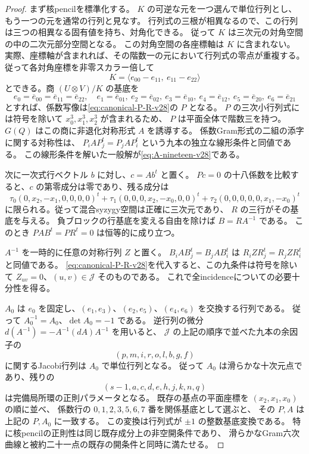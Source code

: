 \begin{proof}
まず核pencilを標準化する。
$K$ の可逆な元を一つ選んで単位行列とし、もう一つの元を通常の行列と見なす。
行列式の三根が相異なるので、この行列は三つの相異なる固有値を持ち、対角化できる。
従って $K$ は三次元の対角空間の中の二次元部分空間となる。
この対角空間の各座標軸は $K$ に含まれない。
実際、座標軸が含まれれば、その階数一の元において行列式の零点が重複する。
従って各対角座標を非零スカラー倍して
\[
 K=\langle e_{00}-e_{11},\ e_{11}-e_{22}\rangle
\]
とできる。商 $(U\otimes V)/K$ の基底を
\[
 e_0=\overline e_{00}=\overline e_{11}=\overline e_{22},\quad
 e_1=\overline e_{01},\ e_2=\overline e_{02},\
 e_3=\overline e_{10},\ e_4=\overline e_{12},\
 e_5=\overline e_{20},\ e_6=\overline e_{21}
\]
とすれば、係数写像は\eqref{eq:canonical-P-R-v28}の $P$ となる。
$P$ の三次小行列式には符号を除いて $x_0^3,x_1^3,x_2^3$ が含まれるため、
$P$ は平面全体で階数三を持つ。
$G(Q)$ はこの商に非退化対称形式 $A$ を誘導する。
係数Gram形式の二組の添字に関する対称性は、
$P_iAP_j^t=P_jAP_i^t$ という九本の独立な線形条件と同値である。
この線形条件を解いた一般解が\eqref{eq:A-nineteen-v28}である。

次に一次式行ベクトル $b$ に対し、$c=Ab^t$ と置く。
$P c=0$ の十八係数を比較すると、$c$ の第零成分は零であり、残る成分は
\[
 \tau_0(0,x_2,-x_1,0,0,0,0)^t+
 \tau_1(0,0,0,x_2,-x_0,0,0)^t+
 \tau_2(0,0,0,0,0,x_1,-x_0)^t
\]
に限られる。従って混合syzygy空間は正確に三次元であり、
$R$ の三行がその基底を与える。
負ブロックの行基底を変える自由を除けば $B=RA^{-1}$ である。
このとき $PAB^t=PR^t=0$ は恒等的に成り立つ。

$A^{-1}$ を一時的に任意の対称行列 $Z$ と置く。
$B_iAB_j^t=B_jAB_i^t$ は $R_iZR_j^t=R_jZR_i^t$ と同値である。
\eqref{eq:canonical-P-R-v28}を代入すると、この九条件は符号を除いて
$Z_{uv}=0$、$(u,v)\in\mathcal J$ そのものである。
これで全incidenceについての必要十分性を得る。

$A_0$ は $e_0$ を固定し、$(e_1,e_3)$、$(e_2,e_5)$、$(e_4,e_6)$ を交換する行列である。
従って $A_0^{-1}=A_0$、$\det A_0=-1$ である。
逆行列の微分 $d(A^{-1})=-A^{-1}(dA)A^{-1}$ を用いると、
$\mathcal J$ の上記の順序で並べた九本の余因子の
\[
 (p,m,i,r,o,l,b,g,f)
\]
に関するJacobi行列は $A_0$ で単位行列となる。
従って $A_0$ は滑らかな十次元点であり、残りの
\[
 (s-1,a,c,d,e,h,j,k,n,q)
\]
は完備局所環の正則パラメータとなる。
既存の基点の平面座標を $(x_2,x_1,x_0)$ の順に並べ、
係数行の $0,1,2,3,5,6,7$ 番を関係基底として選ぶと、
その $P,A$ は上記の $P,A_0$ に一致する。
この変換は行列式が $\pm1$ の整数基底変換である。
特に核pencilの正則性は同じ既存成分上の非空開条件であり、
滑らかなGram六次曲線と被約二十一点の既存の開条件と同時に満たせる。


\end{proof}
